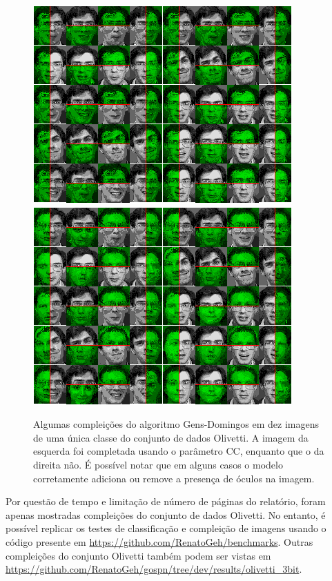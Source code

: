 \documentclass[12pt]{article}
\theoremstyle{plain}
\numberwithin{equation}{section}
\begin{document}
\begin{figure}[h]
  \centering\includegraphics[scale=0.6175]{cmpl/gens/full/r1/face_cmpl_37.png}
  \includegraphics[scale=0.6175]{cmpl/gens/full/r2/face_cmpl_37.png}
  \captionsetup{justification=raggedright}
  \caption{Algumas compleições do algoritmo Gens-Domingos em dez imagens de uma única classe
    do conjunto de dados Olivetti. A imagem da esquerda foi completada usando o parâmetro CC,
    enquanto que o da direita não. É possível notar que em alguns casos o modelo corretamente
    adiciona ou remove a presença de óculos na imagem.}
\end{figure}

Por questão de tempo e limitação de número de páginas do relatório, foram apenas mostradas
compleições do conjunto de dados Olivetti. No entanto, é possível replicar os testes de
classificação e compleição de imagens usando o código presente em
\url{https://github.com/RenatoGeh/benchmarks}. Outras compleições do conjunto Olivetti também podem
ser vistas em \url{https://github.com/RenatoGeh/gospn/tree/dev/results/olivetti_3bit}.
\end{document}

